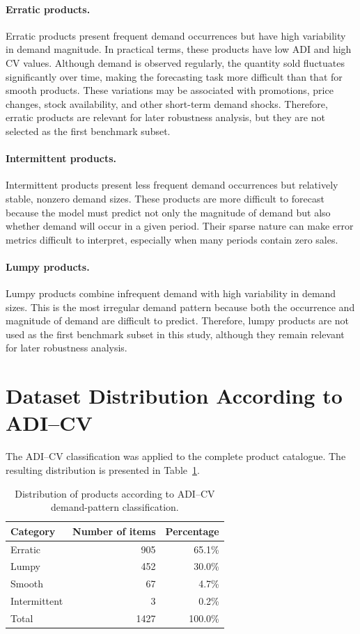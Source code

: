 \paragraph{Erratic products.}
Erratic products present frequent demand occurrences but have high variability in demand magnitude. In practical terms, these products have low ADI and high CV values. Although demand is observed regularly, the quantity sold fluctuates significantly over time, making the forecasting task more difficult than that for smooth products. These variations may be associated with promotions, price changes, stock availability, and other short-term demand shocks. Therefore, erratic products are relevant for later robustness analysis, but they are not selected as the first benchmark subset.

\paragraph{Intermittent products.}
Intermittent products present less frequent demand occurrences but relatively stable, nonzero demand sizes. These products are more difficult to forecast because the model must predict not only the magnitude of demand but also whether demand will occur in a given period. Their sparse nature can make error metrics difficult to interpret, especially when many periods contain zero sales.

\paragraph{Lumpy products.}
Lumpy products combine infrequent demand with high variability in demand sizes. This is the most irregular demand pattern because both the occurrence and magnitude of demand are difficult to predict. Therefore, lumpy products are not used as the first benchmark subset in this study, although they remain relevant for later robustness analysis.

\section{Dataset Distribution According to ADI--CV}
\label{sec:adi_cv_distribution}

The ADI--CV classification was applied to the complete product catalogue. The resulting distribution is presented in Table~\ref{tab:adi_cv_distribution}.

\begin{table}[H]
\centering
\caption{Distribution of products according to ADI--CV demand-pattern classification.}
\label{tab:adi_cv_distribution}
\begin{tabular}{lrr}
\hline
\textbf{Category} & \textbf{Number of items} & \textbf{Percentage} \\
\hline
Erratic & 905 & 65.1\% \\
Lumpy & 452 & 30.0\% \\
Smooth & 67 & 4.7\% \\
Intermittent & 3 & 0.2\% \\
\hline
Total & 1427 & 100.0\% \\
\hline
\end{tabular}
\end{table}

